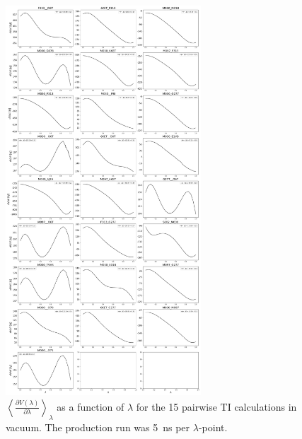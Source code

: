 \begin{figure}[H]
    \centering
    \includegraphics[width=0.65\textwidth]{fig/SI/dG_convergence/TI_vacuum_lambda_curves.png}
    \caption{$\left< \frac{\partial V(\lambda)}{\partial \lambda} \right>_{\lambda}$ as a function of $\lambda$ for the 15 pairwise TI calculations in vacuum. The production run was 5~ns per $\lambda$-point.}
    \label{SIfig:TI_vacuum_curve}
    \end{figure}

